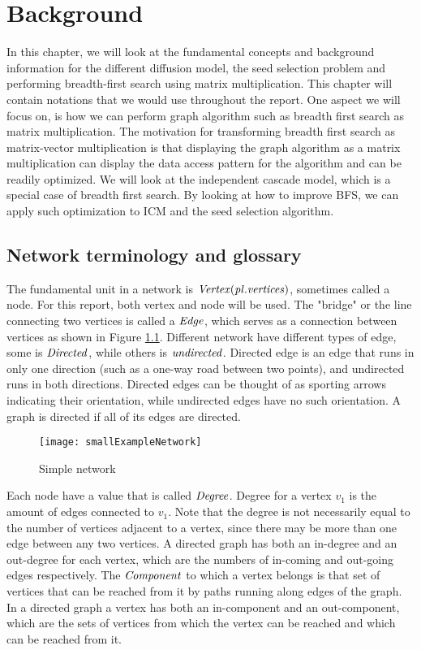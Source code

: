 \chapter{Background} \label{background}

In this chapter, we will look at the fundamental concepts and background information for the different diffusion model, the seed selection problem and performing breadth-first search using matrix multiplication. This chapter will contain notations that we would use throughout the report. One aspect we will focus on, is how we can perform graph algorithm such as breadth first search as matrix multiplication. The motivation for transforming breadth first search as matrix-vector multiplication is that displaying the graph algorithm as a matrix multiplication can display the data access pattern for the algorithm and can be readily optimized\cite{AlgoToMath}. We will look at the independent cascade model, which is a special case of breadth first search\cite{HybridBFS2015}. By looking at how to improve BFS, we can apply such optimization to ICM and the seed selection algorithm. 


\section{Network terminology and glossary}
The fundamental unit in a network is $\it{{Vertex}} (pl. vertices)$, sometimes called a node. For this report, both vertex and node will be used. The "bridge" or the line connecting two vertices is called a $\it{{Edge}}$, which serves as a connection between vertices as shown in Figure \ref{fig:SimpleGraph}.  Different network have different types of edge, some is $\it{Directed}$, while others is $\it{undirected}$. Directed edge is an edge that runs in only one direction (such as a one-way road between two points), and undirected runs in both directions. Directed edges can be thought of as sporting arrows indicating their orientation, while undirected edges have no such orientation. A graph is directed if all of its edges are directed.

\begin{figure}[!ht]
	\texttt{[image: smallExampleNetwork]}
	\caption{Simple network} 
	\label{fig:SimpleGraph}
\end{figure}


Each node have a value that is called $\it{{Degree}}$. Degree for a vertex $v_1$ is the amount of edges connected to $v_1$. Note that the degree is not necessarily equal to the number of vertices adjacent to a vertex, since there may be more than one edge between any two vertices. A directed graph has both an in-degree and an out-degree for each vertex, which are the numbers of in-coming and out-going edges respectively. The $\it{{Component}}$ to which a vertex belongs is that set of vertices that can be reached from it by paths running along edges of the graph. In a directed graph a vertex has both an in-component and an out-component, which are the sets of vertices from which the vertex can be reached and which can be reached from it.

